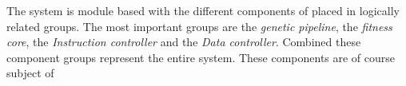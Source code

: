 The system is module based with the different components of placed in logically related groups. The most important groups are the \emph{genetic pipeline}, the \emph{fitness core}, the \emph{Instruction controller} and the \emph{Data controller}. Combined these component groups represent the entire system. These components are of course subject of 